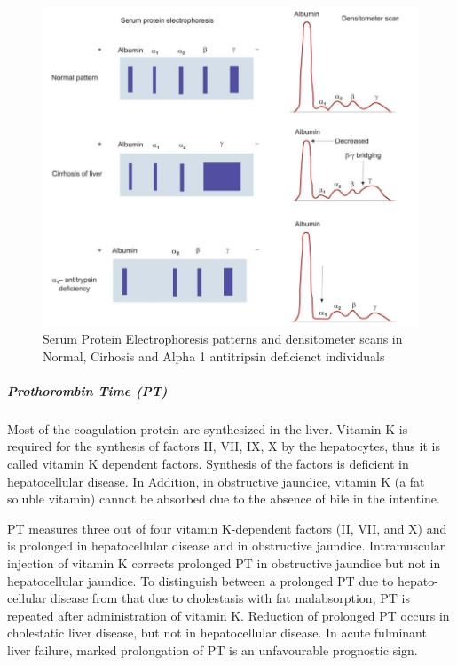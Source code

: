 \documentclass[
  letterpaper,
  DIV=11,
  numbers=noendperiod]{scrreprt}
\let\oldsubparagraph\subparagraph
\renewcommand{\subparagraph}[1]{\oldsubparagraph{#1}\mbox{}}
\begin{document}
\begin{figure}

{\centering \includegraphics{image/spe.png}

}

\caption{Serum Protein Electrophoresis patterns and densitometer scans
in Normal, Cirhosis and Alpha 1 antitripsin deficienct individuals}

\end{figure}%

\subparagraph{Prothorombin Time (PT)}\label{prothorombin-time-pt}

Most of the coagulation protein are synthesized in the liver. Vitamin K
is required for the synthesis of factors II, VII, IX, X by the
hepatocytes, thus it is called vitamin K dependent factors. Synthesis of
the factors is deficient in hepatocellular disease. In Addition, in
obstructive jaundice, vitamin K (a fat soluble vitamin) cannot be
absorbed due to the absence of bile in the intentine.

PT measures three out of four vitamin K-dependent factors (II, VII, and
X) and is prolonged in hepatocellular disease and in obstructive
jaundice. Intramuscular injection of vitamin K corrects prolonged PT in
obstructive jaundice but not in hepatocellular jaundice. To distinguish
between a prolonged PT due to hepato- cellular disease from that due to
cholestasis with fat malabsorption, PT is repeated after administration
of vitamin K. Reduction of prolonged PT occurs in cholestatic liver
disease, but not in hepatocellular disease. In acute fulminant liver
failure, marked prolongation of PT is an unfavourable prognostic sign.
\end{document}
